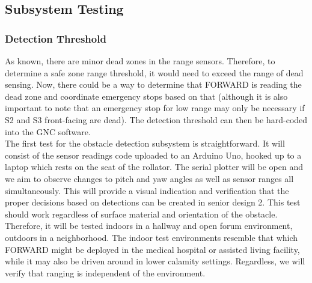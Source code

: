 \subsection{Subsystem Testing}

\subsubsection{Detection Threshold}
\noindent As known, there are minor dead zones in the range sensors. Therefore, to determine a safe zone range threshold, it would need to exceed the range of dead sensing. Now, there could be a way to determine that FORWARD is reading the dead zone and coordinate emergency stops based on that (although it is also important to note that an emergency stop for low range may only be necessary if S2 and S3 front-facing are dead). The detection threshold can then be hard-coded into the GNC software.\\

\noindent The first test for the obstacle detection subsystem is straightforward. It will consist of the sensor readings code uploaded to an Arduino Uno, hooked up to a laptop which rests on the seat of the rollator. The serial plotter will be open and we aim to observe changes to pitch and yaw angles as well as sensor ranges all simultaneously. This will provide a visual indication and verification that the proper decisions based on detections can be created in senior design 2. This test should work regardless of surface material and orientation of the obstacle. Therefore, it will be tested indoors in a hallway and open forum environment, outdoors in a neighborhood. The indoor test environments resemble that which FORWARD might be deployed in the medical hospital or assisted living facility, while it may also be driven around in lower calamity settings. Regardless, we will verify that ranging is independent of the environment.\\


